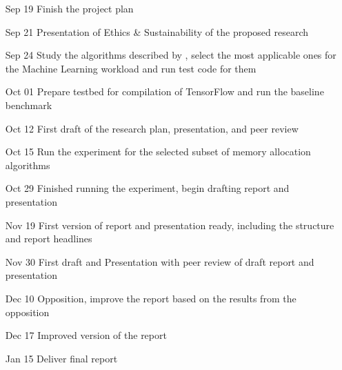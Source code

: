 \documentclass[12pt,twoside]{article}
\begin{document}

\begin{enumerate}[leftmargin=2cm]
    \item[Sep 19] Finish the project plan
    \item[Sep 21] Presentation of Ethics \& Sustainability of the proposed research
    \item[Sep 24] Study the algorithms described by \citeauthor{Vinkler2015} \cite{Vinkler2015}, select the most applicable ones for the Machine Learning workload and run test code for them
    \item[Oct 01] Prepare testbed for compilation of TensorFlow and run the baseline benchmark
    \item[Oct 12] First draft of the research plan, presentation, and peer review
    \item[Oct 15] Run the experiment for the selected subset of memory allocation algorithms
    \item[Oct 29] Finished running the experiment, begin drafting report and presentation
    \item[Nov 19] First version of report and presentation ready, including the structure and report headlines
    \item[Nov 30] First draft and Presentation with peer review of draft report and presentation
    \item[Dec 10] Opposition, improve the report based on the results from the opposition
    \item[Dec 17] Improved version of the report
    \item[Jan 15] Deliver final report 
\end{enumerate}






\end{document}
